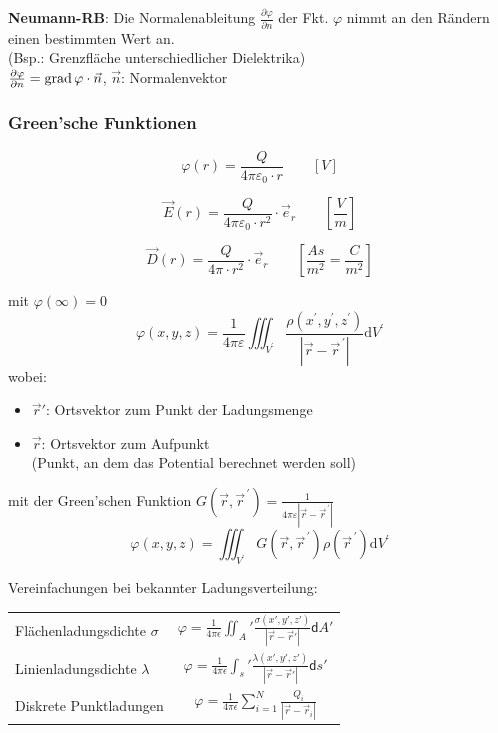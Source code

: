 		\textbf{Neumann-RB}: Die Normalenableitung $ \tfrac{\partial\varphi}{\partial
				n} $ der Fkt. $ \varphi $ nimmt an den Rändern einen bestimmten Wert an. \\
		(Bsp.: Grenzfläche unterschiedlicher Dielektrika) \\
		\(\frac{\partial \varphi}{\partial n} = \operatorname{grad} \varphi \cdot \vec{n}\), \(\vec{n}\): Normalenvektor

	\subsubsection{Green'sche Funktionen}
		\[ \varphi (r) = \dfrac{Q}{4 \pi \varepsilon_0 \cdot r} \qquad\left[V\right] \]

		\[ \vec{E}(r) = \dfrac{Q}{4 \pi \varepsilon_0 \cdot r^2}\cdot\vec{e}_r \qquad\left[\frac{V}{m}\right] \]

		\[ \vec{D}(r) = \dfrac{Q}{4 \pi \cdot r^2}\cdot\vec{e}_r \qquad\left[\frac{As}{m^2}=\frac{C}{m^2}\right] \]


		mit $\varphi(\infty)=0$
		\[
			\varphi(x, y, z)=\frac{1}{4 \pi \varepsilon} \iiint_{V^{\prime}}
			\frac{\rho\left(x^{\prime}, y^{\prime},
				z^{\prime}\right)}{\left|\vec{r}-\vec{r}^{\,\prime}\right|} \mathrm{d}
			V^{\prime}
		\]
		wobei:
		\begin{itemize}
			\item \(\vec{r}'\): Ortsvektor zum Punkt der Ladungsmenge
			\item \(\vec{r}\): Ortsvektor zum Aufpunkt \\ (Punkt, an dem das Potential berechnet werden soll)
		\end{itemize}

		mit der Green'schen Funktion $G\left(\vec{r},
			\vec{r}^{\,\prime}\right)=\frac{1}{4 \pi
				\varepsilon\left|\vec{r}-\vec{r}^{\,\prime}\right|}$
		\[ \varphi(x, y, z)=\iiint_{V^{\prime}} G\left(\vec{r}, \vec{r}^{\,\prime}\right) \rho\left(\vec{r}^{\,\prime}\right) \mathrm{d} V^{\prime} \]

		Vereinfachungen bei bekannter Ladungsverteilung:
		\begin{table}[H]
			\centering
			\begin{tabular}{l | c}
				Flächenladungsdichte \(\sigma\) & \(\varphi = \frac{1}{4\pi\epsilon} \iint_A' \frac{\sigma(x',y',z')}{\left|\vec{r} - \vec{r}'\right|} \mathsf{d}A'\) \\
				Linienladungsdichte \(\lambda\) & \(\varphi = \frac{1}{4\pi\epsilon} \int_s' \frac{\lambda(x',y',z')}{\left|\vec{r} - \vec{r}'\right|} \mathsf{d}s'\) \\
				Diskrete Punktladungen & \(\varphi = \frac{1}{4\pi\epsilon} \sum_{i=1}^N \frac{Q_i}{\left|\vec{r} - \vec{r}_i\right|}\)
			\end{tabular}
		\end{table}

